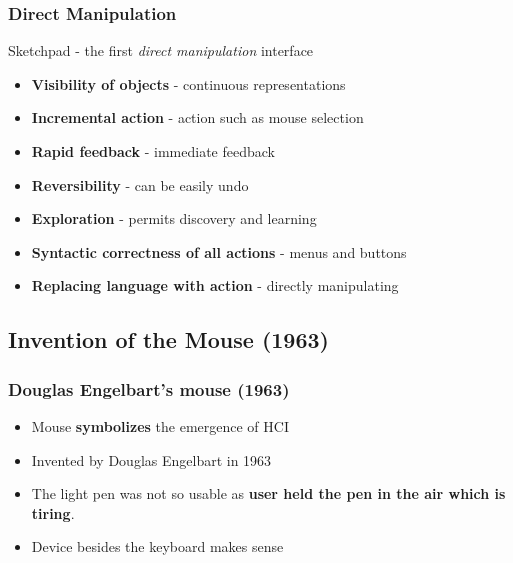 \documentclass{beamer}
\begin{document}
\begin{frame}
\frametitle{Direct Manipulation}
Sketchpad - the first \textit{direct manipulation} interface
\begin{itemize}
	\item \textbf{Visibility of objects} - continuous representations %
	\item \textbf{Incremental action} - action such as mouse selection %
	\item \textbf{Rapid feedback} - immediate feedback %
	\item \textbf{Reversibility} - can be easily undo %
	\item \textbf{Exploration} - permits discovery and learning %
	\item \textbf{Syntactic correctness of all actions} - menus and buttons %
	\item \textbf{Replacing language with action} - directly manipulating %
\end{itemize} 
\end{frame}

\subsection{Invention of the Mouse (1963)} %

\begin{frame}
\frametitle{Douglas Engelbart's mouse (1963)}
\begin{itemize}
	\item Mouse \textbf{symbolizes} the emergence of HCI
	\item Invented by Douglas Engelbart in 1963%
	\item The light pen was not so usable as \textbf{user held the pen in the air which is tiring}. %
	\item Device besides the keyboard makes sense
\end{itemize}
\end{frame}
\end{document}
